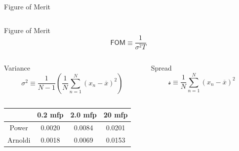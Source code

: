 \documentclass[xcolor={usenames, dvipsnames},]{beamer}
\begin{document}
\begin{frame}{Figure of Merit}
    \begin{columns}
    \begin{column}{0.45\textwidth}
    \begin{block}{Figure of Merit}
        \begin{equation*}
            \mathsf{FOM} \equiv \frac{1}{\sigma^2 T}
        \end{equation*}
    \end{block}
    \end{column}
    \end{columns}

    \begin{columns}[m]
        \begin{column}{0.45\textwidth}
        \begin{block}{Variance}
            \begin{equation*}
                \sigma^2 \equiv \frac{1}{N-1}\left(\frac{1}{N}\sum_{n=1}^N \left(x_n - \overline{x}\right)^2\right)
            \end{equation*}
        \end{block}
        \end{column}

        \begin{column}{0.45\textwidth}
        \begin{block}{Spread}
            \begin{equation*}
                \mathscr{s} \equiv \frac{1}{N}\sum_{n=1}^N \left(x_n - \overline{x}\right)^2
            \end{equation*}
        \end{block}
        \end{column}
    \end{columns}

        
    \pause
    \vspace{1ex}
    \begin{table}[h]
        \centering
        \begin{tabular}{cccc}
            \toprule
            & 0.2 mfp & 2.0 mfp & 20 mfp \\
            \midrule
            Power    & 0.0020 & 0.0084 & 0.0201 \\
            Arnoldi  & 0.0018 & 0.0069 & 0.0153 \\
            \bottomrule
        \end{tabular}
    \end{table}
\end{frame}
\end{document}
